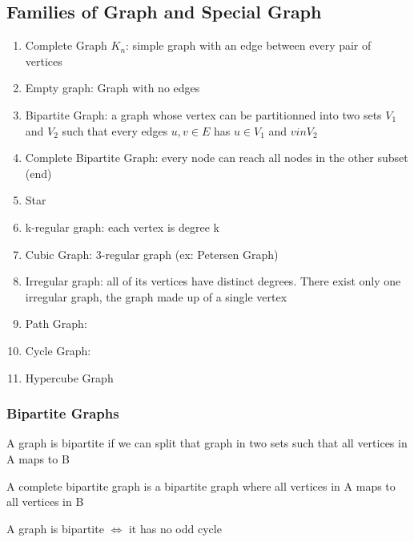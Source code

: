 \documentclass{article}
\begin{document}
\subsection{Families of Graph and Special Graph}%
\label{sub:Families of Graph and Special Graph}

\begin{enumerate}
    \item Complete Graph $K_n$: simple graph with an edge between every
	pair of vertices
    \item Empty graph: Graph with no edges
    \item Bipartite Graph: a graph whose vertex can be partitionned into
	two sets $V_1$ and $V_2$ such that every edges $ u,v \in E$ has
	$u \in V_1$ and $v in V_2$
    \item Complete Bipartite Graph: every node can reach all nodes in
	the other subset (end)
    \item Star
    \item k-regular graph: each vertex is degree k
    \item Cubic Graph: 3-regular graph (ex: Petersen Graph)
    \item Irregular graph: all of its vertices have distinct degrees. There
	exist only one irregular graph, the graph made up of a single vertex
    \item Path Graph:
    \item Cycle Graph:
    \item Hypercube Graph
\end{enumerate}

\subsubsection{Bipartite Graphs}%
\label{sub:Bipartite Graphs}

\begin{definition}
    A graph is bipartite if we can split that graph in two sets such that
    all vertices in A maps to B
\end{definition}

\begin{definition}
    A complete bipartite graph is a bipartite graph where all vertices in
    A maps to all vertices in B
\end{definition}

\begin{theorem}
    A graph is bipartite $\Longleftrightarrow$ it has no odd cycle
\end{theorem}
\end{document}
